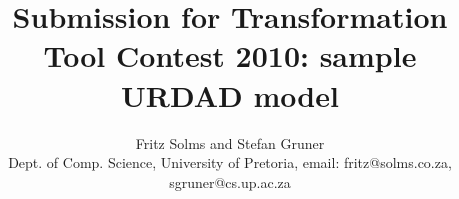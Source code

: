 \documentclass[a4paper,twoside]{article}
\begin{document}
\title{Submission for Transformation Tool Contest 2010: sample URDAD model}

\author{ Fritz Solms  and Stefan Gruner\\
  {\small Dept. of Comp. Science, University of Pretoria, email: fritz@solms.co.za, sgruner@cs.up.ac.za}}

\maketitle

%

\tableofcontents

















\end{document}
